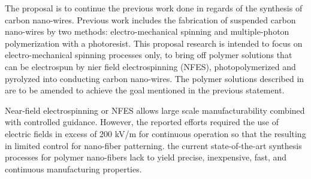 The proposal is to continue the previous work done in regards of the synthesis of carbon nano-wires. Previous work includes the fabrication of suspended carbon nano-wires by two methods: electro-mechanical spinning and multiple-photon polymerization with a photoresist. \cite{Cardenas2017} This proposal research is intended to focus on electro-mechanical spinning processes only, to bring off polymer solutions that can be electrospun by nier field electrospinning (NFES), photopolymerized and pyrolyzed into conducting carbon nano-wires. The polymer solutions described in \cite{Cardenas2017} are to be amended to achieve the goal mentioned in the previous statement.

Near-field electrospinning or NFES allows large scale manufacturability combined with controlled guidance. \cite{Madou2011} However, the reported efforts required the use of electric fields in excess of 200 kV/m for continuous operation so that the resulting in limited control for nano-fiber patterning. \cite{Madou2011} the current state-of-the-art synthesis processes for polymer nano-fibers lack to yield precise, inexpensive, fast, and continuous manufacturing properties.






